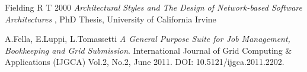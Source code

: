 \documentclass[a4paper]{jpconf}
\begin{document}
\begin{thebibliography}{30}




Fielding R T 2000 {\it Architectural Styles and The Design of Network-based
Software Architectures }, PhD Thesis, University of California Irvine

A.Fella, E.Luppi, L.Tomassetti \emph{A General Purpose Suite for Job Management, Bookkeeping and Grid Submission}. International Journal of Grid Computing \& Applications (IJGCA) Vol.2, No.2, June 2011. DOI: 10.5121/ijgca.2011.2202.

\end{thebibliography}
\end{document}
